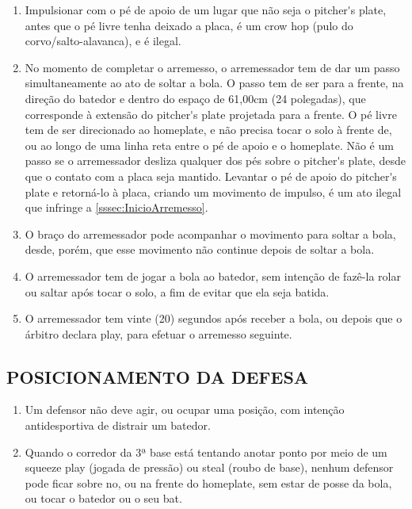 \begin{multicols}{2}
\begin{enumerate}[label=\alph*)]
		\item  Impulsionar com o p\'e de apoio de um lugar que n\~ao seja o \gls{pitcher's plate}, antes que o p\'e livre tenha deixado a placa, \'e um \gls{crow hop} (pulo do corvo/salto-alavanca), e \'e ilegal. 
		
		\item  No momento de completar o arremesso, o arremessador tem de dar um passo simultaneamente ao ato de soltar a bola. O passo tem de ser para a frente, na dire\c{c}\~ao do batedor e dentro do espa\c{c}o de 61,00cm (24 polegadas), que corresponde \`a extens\~ao do \gls{pitcher's plate} projetada para a frente. O p\'e livre tem de ser direcionado ao \gls{homeplate}, e n\~ao precisa tocar o solo \`a frente de, ou ao longo de uma linha reta entre o p\'e de apoio e o \gls{homeplate}. N\~ao \'e um passo se o arremessador desliza qualquer dos p\'es sobre o \gls{pitcher's plate}, desde que o contato com a placa seja mantido. Levantar o p\'e de apoio do \gls{pitcher's plate} e retorn\'a-lo \`a placa, criando um movimento de impulso, \'e um ato ilegal que infringe a \autoref{sssec:InicioArremesso}.
		
		\item  O bra\c{c}o do arremessador pode acompanhar o movimento para soltar a bola, desde, por\'em, que esse movimento n\~ao continue depois de soltar a bola.	\item O arremessador tem de jogar a bola ao batedor, sem inten\c{c}\~ao de faz\^e-la rolar ou saltar ap\'os tocar o solo, a fim de evitar que ela seja batida. 
		
		\item  O arremessador tem vinte (20) segundos ap\'os receber a bola, ou depois que o \'arbitro declara \gls{play}, para efetuar o arremesso seguinte. 
	\end{enumerate}
	
	\subsection{POSICIONAMENTO DA DEFESA} 
	
	\begin{enumerate}[label=\alph*)]
		\item Um defensor n\~ao deve agir, ou ocupar uma posi\c{c}\~ao, com inten\c{c}\~ao antidesportiva de distrair um batedor. 
		
		\item  Quando o corredor da 3ª base est\'a tentando anotar ponto por meio de um \gls{squeeze play} (jogada de press\~ao) ou \gls{steal} (roubo de base), nenhum defensor pode ficar sobre no, ou na frente do \gls{homeplate}, sem estar de posse da bola, ou tocar o batedor ou o seu \gls{bat}. 
	\end{enumerate}
	

\end{multicols}
